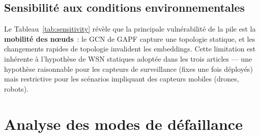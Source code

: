 \subsection{Sensibilité aux conditions environnementales}

\begin{table}[htbp]
\centering
\caption{Analyse de sensibilité de la pile protocolaire aux conditions environnementales. $\uparrow$/$\downarrow$~: impact positif/négatif sur la performance.}
\label{tab:sensitivity}
\end{table}

Le Tableau~\ref{tab:sensitivity} révèle que la principale vulnérabilité de la pile est la \textbf{mobilité des n\oe{}uds}~: le GCN de GAPF capture une topologie statique, et les changements rapides de topologie invalident les embeddings. Cette limitation est inhérente à l'hypothèse de WSN statiques adoptée dans les trois articles --- une hypothèse raisonnable pour les capteurs de surveillance (fixes une fois déployés) mais restrictive pour les scénarios impliquant des capteurs mobiles (drones, robots).


\section{Analyse des modes de défaillance}\label{sec:disc-failure-modes}

